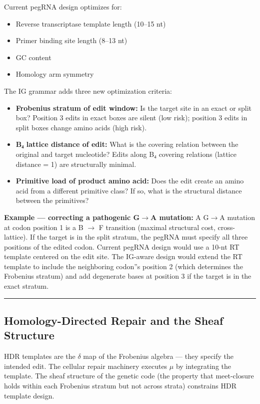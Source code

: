 \documentclass[12pt,a4paper]{article}
\begin{document}
Current pegRNA design optimizes for:

\begin{itemize}
    \item Reverse transcriptase template length (10--15 nt)
    \item Primer binding site length (8--13 nt)
    \item GC content
    \item Homology arm symmetry
\end{itemize}

The IG grammar adds three new optimization criteria:

\begin{itemize}
    \item \textbf{Frobenius stratum of edit window:} Is the target site in an exact or split box? Position 3 edits in exact boxes are silent (low risk); position 3 edits in split boxes change amino acids (high risk).
    \item \textbf{B₄ lattice distance of edit:} What is the covering relation between the original and target nucleotide? Edits along B₄ covering relations (lattice distance = 1) are structurally minimal.
    \item \textbf{Primitive load of product amino acid:} Does the edit create an amino acid from a different primitive class? If so, what is the structural distance between the primitives?
\end{itemize}

\textbf{Example --- correcting a pathogenic G$\rightarrow$A mutation:}
A G$\rightarrow$A mutation at codon position 1 is a B $\rightarrow$ F transition (maximal structural cost, cross-lattice). If the target is in the split stratum, the pegRNA must specify all three positions of the edited codon. Current pegRNA design would use a 10-nt RT template centered on the edit site. The IG-aware design would extend the RT template to include the neighboring codon''s position 2 (which determines the Frobenius stratum) and add degenerate bases at position 3 if the target is in the exact stratum.

\begin{center}
\rule{0.5\textwidth}{0.4pt}
\end{center}

\subsection{Homology-Directed Repair and the Sheaf Structure}

HDR templates are the $\delta$ map of the Frobenius algebra --- they specify the intended edit. The cellular repair machinery executes $\mu$ by integrating the template. The sheaf structure of the genetic code (the property that meet-closure holds within each Frobenius stratum but not across strata) constrains HDR template design.
\end{document}
